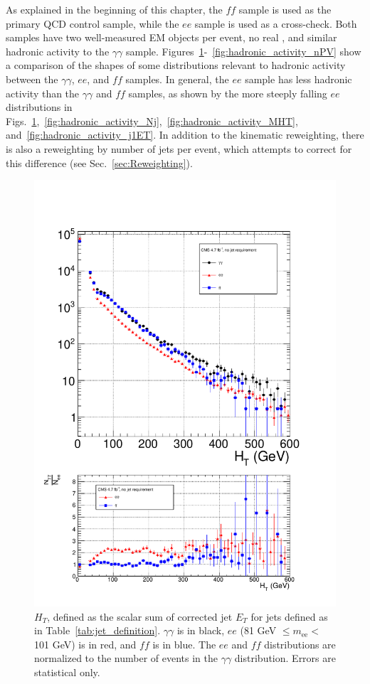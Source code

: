 \documentclass[dissertation.tex]{subfiles}
\begin{document}
As explained in the beginning of this chapter, the $\mathit{ff}$ sample is used as the primary QCD control sample, while the $ee$ sample is used as a cross-check.  Both samples have two well-measured EM objects per event, no real \MET, and similar hadronic activity to the $\gamma\gamma$ sample.  Figures~\ref{fig:hadronic_activity_HT}-~\ref{fig:hadronic_activity_nPV} show a comparison of the shapes of some distributions relevant to hadronic activity between the $\gamma\gamma$, $ee$, and $\mathit{ff}$ samples.  In general, the $ee$ sample has less hadronic activity than the $\gamma\gamma$ and $\mathit{ff}$ samples, as shown by the more steeply falling $ee$ distributions in Figs.~\ref{fig:hadronic_activity_HT},~\ref{fig:hadronic_activity_Nj},~\ref{fig:hadronic_activity_MHT}, and~\ref{fig:hadronic_activity_j1ET}.  In addition to the kinematic reweighting, there is also a reweighting by number of jets per event, which attempts to correct for this difference (see Sec.~\ref{sec:Reweighting}).

\begin{figure}
	\centering
	\includegraphics[scale=0.5]{hadronic_activity_HT}
	\caption{$H_{T}$, defined as the scalar sum of corrected jet $E_{T}$ for jets defined as in Table~\ref{tab:jet_definition}.  $\gamma\gamma$ is in black, $ee$ (81 GeV $\leq m_{\mathrm{ee}} <$ 101 GeV) is in red, and $\mathit{ff}$ is in blue.  The $ee$ and $\mathit{ff}$ distributions are normalized to the number of events in the $\gamma\gamma$ distribution.  Errors are statistical only.}
	\label{fig:hadronic_activity_HT}
\end{figure}
\end{document}
